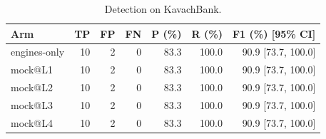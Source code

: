 \begin{table}[t]
\centering
\begin{tabular}{lrrrrrr}
\hline
Arm & TP & FP & FN & P (\%) & R (\%) & F1 (\%) [95\% CI] \\
\hline
engines-only & 10 & 2 & 0 & 83.3 & 100.0 & 90.9 [73.7, 100.0] \\
mock@L1 & 10 & 2 & 0 & 83.3 & 100.0 & 90.9 [73.7, 100.0] \\
mock@L2 & 10 & 2 & 0 & 83.3 & 100.0 & 90.9 [73.7, 100.0] \\
mock@L3 & 10 & 2 & 0 & 83.3 & 100.0 & 90.9 [73.7, 100.0] \\
mock@L4 & 10 & 2 & 0 & 83.3 & 100.0 & 90.9 [73.7, 100.0] \\
\hline
\end{tabular}
\caption{Detection on KavachBank.}
\label{tab:detection}
\end{table}
